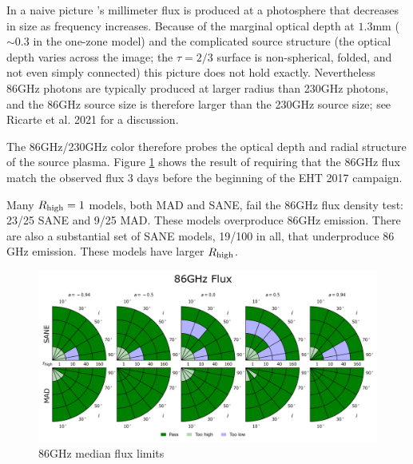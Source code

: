 
In a naive picture \sgra's millimeter flux is produced at a photosphere that decreases in size as frequency increases.  Because of the marginal optical depth at $1.3$mm ($\sim 0.3$ in the one-zone model) and the complicated source structure (the optical depth varies across the image; the $\tau = 2/3$ surface is non-spherical, folded, and not even simply connected) this picture does not hold exactly.  Nevertheless 86GHz photons are typically produced at larger radius than 230GHz photons, and the 86GHz source size is therefore larger than the 230GHz source size; see Ricarte et al. 2021 for a discussion.

The 86GHz/230GHz color therefore probes the optical depth and radial structure of the source plasma.  Figure \ref{fig:cmp_86ghz_flux} shows the result of requiring that the 86GHz flux match the observed flux 3 days before the beginning of the EHT 2017 campaign.

Many $R_\mathrm{high} = 1$ models, both MAD and SANE, fail the $86$GHz flux density test: 23/25 SANE and 9/25 MAD.  These models overproduce $86$GHz emission.
There are also a substantial set of SANE models, 19/100 in all, that underproduce $86$GHz emission.  These models have larger $R_\mathrm{high}$.

\begin{figure}
  \centering
  \includegraphics[width=\columnwidth]{./figures/86GHz_flux_Constraints.png}
  \caption{86GHz median flux limits}
  \label{fig:cmp_86ghz_flux}
\end{figure}



